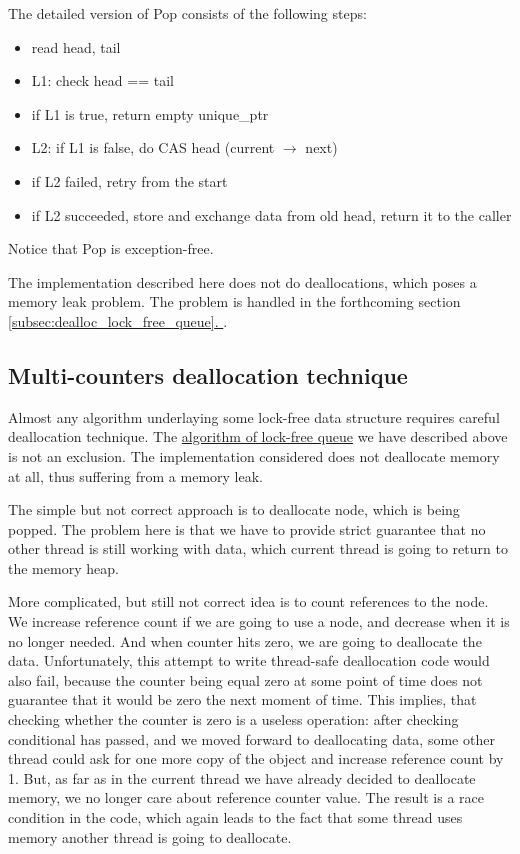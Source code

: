 \documentclass{article}
\newcommand*{\fullref}[1]{\hyperref[{#1}]{\ref*{#1}. \nameref*{#1}}}
\begin{document}
The detailed version of Pop consists of the following steps:
\begin{itemize}
	\item read head, tail
	\item L1: check head == tail
	\item if L1 is true, return empty unique\_ptr
	\item L2: if L1 is false, do CAS head (current $\rightarrow$ next)
	\item if L2 failed, retry from the start
	\item if L2 succeeded, store and exchange data from old head, return it to the caller
\end{itemize}

Notice that Pop is exception-free.

The implementation described here does not do deallocations, which poses a memory leak problem. The problem is handled in the forthcoming section \fullref{subsec:dealloc_lock_free_queue}.

\subsection{Multi-counters deallocation technique}
\label{subsec:three_counters}

Almost any algorithm underlaying some lock-free data structure requires careful deallocation technique. The \hyperref[subsec:lock_free_queue]{algorithm of lock-free queue} we have described above is not an exclusion. The implementation considered does not deallocate memory at all, thus suffering from a memory leak.

The simple but not correct approach is to deallocate node, which is being popped. The problem here is that we have to provide strict guarantee that no other thread is still working with data, which current thread is going to return to the memory heap.

More complicated, but still not correct idea is to count references to the node. We increase reference count if we are going to use a node, and decrease when it is no longer needed. And when counter hits zero, we are going to deallocate the data. Unfortunately, this attempt to write thread-safe deallocation code would also fail, because the counter being equal zero at some point of time does not guarantee that it would be zero the next moment of time. This implies, that checking whether the counter is zero is a useless operation: after checking conditional has passed, and we moved forward to deallocating data, some other thread could ask for one more copy of the object and increase reference count by 1. But, as far as in the current thread we have already decided to deallocate memory, we no longer care about reference counter value. The result is a race condition in the code, which again leads to the fact that some thread uses memory another thread is going to deallocate.
\end{document}
